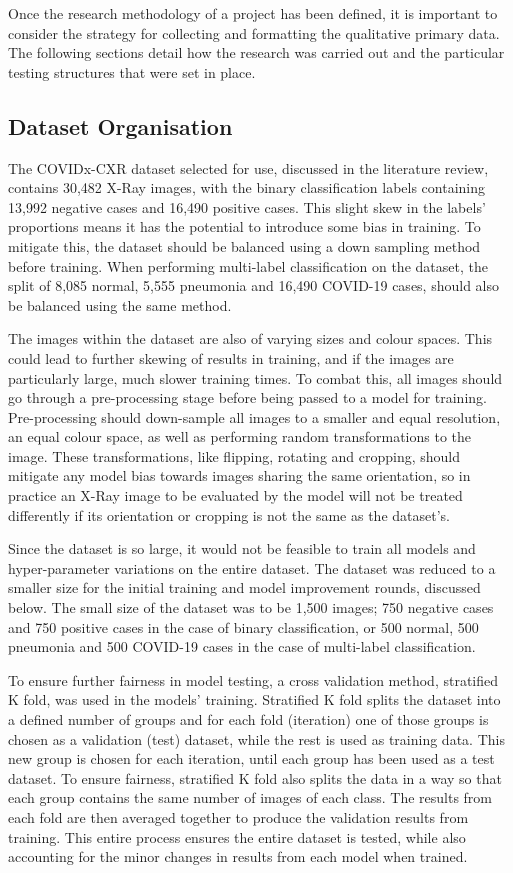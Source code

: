 Once the research methodology of a project has been defined, it is important to consider the strategy for collecting and formatting the qualitative primary data. The following sections detail how the research was carried out and the particular testing structures that were set in place.

\subsection{Dataset Organisation}
The COVIDx-CXR dataset selected for use, discussed in the literature review, contains 30,482 X-Ray images, with the binary classification labels containing 13,992 negative cases and 16,490 positive cases. This slight skew in the labels' proportions means it has the potential to introduce some bias in training. To mitigate this, the dataset should be balanced using a down sampling method before training. When performing multi-label classification on the dataset, the split of 8,085 normal, 5,555 pneumonia and 16,490 COVID-19 cases, should also be balanced using the same method.

The images within the dataset are also of varying sizes and colour spaces. This could lead to further skewing of results in training, and if the images are particularly large, much slower training times. To combat this, all images should go through a pre-processing stage before being passed to a model for training. Pre-processing should down-sample all images to a smaller and equal resolution, an equal colour space, as well as performing random transformations to the image. These transformations, like flipping, rotating and cropping, should mitigate any model bias towards images sharing the same orientation, so in practice an X-Ray image to be evaluated by the model will not be treated differently if its orientation or cropping is not the same as the dataset's.

Since the dataset is so large, it would not be feasible to train all models and hyper-parameter variations on the entire dataset. The dataset was reduced to a smaller size for the initial training and model improvement rounds, discussed below. The small size of the dataset was to be 1,500 images; 750 negative cases and 750 positive cases in the case of binary classification, or 500 normal, 500 pneumonia and 500 COVID-19 cases in the case of multi-label classification.

To ensure further fairness in model testing, a cross validation method, stratified K fold, was used in the models' training. Stratified K fold splits the dataset into a defined number of groups and for each fold (iteration) one of those groups is chosen as a validation (test) dataset, while the rest is used as training data. This new group is chosen for each iteration, until each group has been used as a test dataset. To ensure fairness, stratified K fold also splits the data in a way so that each group contains the same number of images of each class. The results from each fold are then averaged together to produce the validation results from training. This entire process ensures the entire dataset is tested, while also accounting for the minor changes in results from each model when trained.

